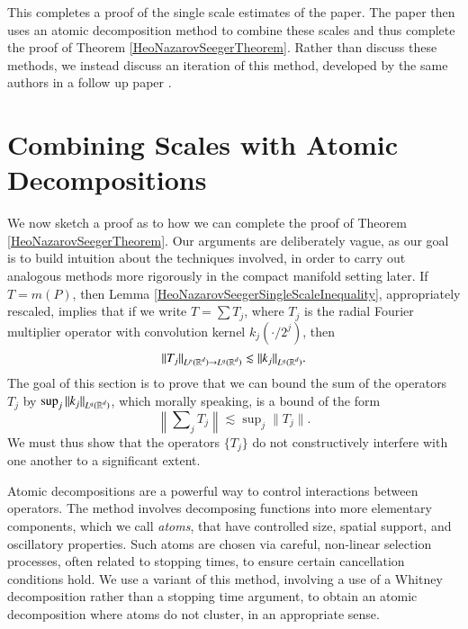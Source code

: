 This completes a proof of the single scale estimates of the paper. The paper then uses an atomic decomposition method to combine these scales and thus complete the proof of Theorem \ref{HeoNazarovSeegerTheorem}. Rather than discuss these methods, we instead discuss an iteration of this method, developed by the same authors in a follow up paper \cite{HeoandNazarovandSeeger2}.

\section{Combining Scales with Atomic Decompositions} \label{sec:combiningscaleswithatomicdecompositions}

We now sketch a proof as to how we can complete the proof of Theorem \ref{HeoNazarovSeegerTheorem}. Our arguments are deliberately vague, as our goal is to build intuition about the techniques involved, in order to carry out analogous methods more rigorously in the compact manifold setting later. If $T = m(P)$, then Lemma \ref{HeoNazarovSeegerSingleScaleInequality}, appropriately rescaled, implies that if we write $T = \sum T_j$, where $T_j$ is the radial Fourier multiplier operator with convolution kernel $k_j(\cdot/2^j)$, then
%
\begin{equation} \label{individualscaleoperatorbound}
    \| T_j \|_{L^p(\operatorname{\mathbb{R}}^d) \to L^q(\operatorname{\mathbb{R}}^d)} \lesssim \| k_j \|_{L^q(\operatorname{\mathbb{R}}^d)}.
\end{equation}
%
The goal of this section is to prove that we can bound the sum of the operators $T_j$ by $\sup_j \| k_j \|_{L^q(\operatorname{\mathbb{R}}^d)}$, which morally speaking, is a bound of the form
%
\begin{equation}
  \left\| \sum\nolimits_j T_j \right\| \lesssim \sup\nolimits_j \| T_j \|.
\end{equation}
%
We must thus show that the operators $\{ T_j \}$ do not constructively interfere with one another to a significant extent.

Atomic decompositions are a powerful way to control interactions between operators. The method involves decomposing functions into more elementary components, which we call \emph{atoms}, that have controlled size, spatial support, and oscillatory properties. Such atoms are chosen via careful, non-linear selection processes, often related to stopping times, to ensure certain cancellation conditions hold. We use a variant of this method, involving a use of a Whitney decomposition rather than a stopping time argument, to obtain an atomic decomposition where atoms do not cluster, in an appropriate sense.

